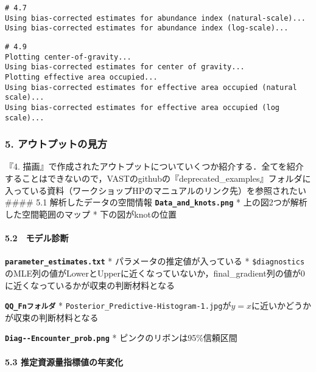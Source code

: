 \documentclass[]{article}
\let\oldparagraph\paragraph
\renewcommand{\paragraph}[1]{\oldparagraph{#1}\mbox{}}
\begin{document}
\begin{verbatim}
# 4.7
Using bias-corrected estimates for abundance index (natural-scale)...  
Using bias-corrected estimates for abundance index (log-scale)...
\end{verbatim}

\begin{verbatim}
# 4.9
Plotting center-of-gravity...    
Using bias-corrected estimates for center of gravity...  
Plotting effective area occupied...  
Using bias-corrected estimates for effective area occupied (natural scale)...  
Using bias-corrected estimates for effective area occupied (log scale)...
\end{verbatim}

\hypertarget{ux30a2ux30a6ux30c8ux30d7ux30c3ux30c8ux306eux898bux65b9}{%
\subsubsection{5.
アウトプットの見方}\label{ux30a2ux30a6ux30c8ux30d7ux30c3ux30c8ux306eux898bux65b9}}

『4.
描画』で作成されたアウトプットについていくつか紹介する．全てを紹介することはできないので，VASTのgithubの『deprecated\_examples』フォルダに入っている資料（ワークショップHPのマニュアルのリンク先）を参照されたい
\#\#\#\# 5.1 解析したデータの空間情報
\textbf{\texttt{Data\_and\_knots.png}} *
上の図2つが解析した空間範囲のマップ * 下の図がknotの位置

\hypertarget{ux30e2ux30c7ux30ebux8a3aux65ad}{%
\paragraph{5.2　モデル診断}\label{ux30e2ux30c7ux30ebux8a3aux65ad}}

\textbf{\texttt{parameter\_estimates.txt}} *
パラメータの推定値が入っている *
\texttt{\$diagnostics}のMLE列の値がLowerとUpperに近くなっていないか，final\_gradient列の値が0に近くなっているかが収束の判断材料となる

\textbf{\texttt{QQ\_Fnフォルダ}} *
\texttt{Posterior\_Predictive-Histogram-1.jpg}が\(y = x\)に近いかどうかが収束の判断材料となる

\textbf{\texttt{Diag-\/-Encounter\_prob.png}} *
ピンクのリボンは95\%信頼区間

\hypertarget{ux63a8ux5b9aux8cc7ux6e90ux91cfux6307ux6a19ux5024ux306eux5e74ux5909ux5316}{%
\paragraph{5.3
推定資源量指標値の年変化}\label{ux63a8ux5b9aux8cc7ux6e90ux91cfux6307ux6a19ux5024ux306eux5e74ux5909ux5316}}
\end{document}
